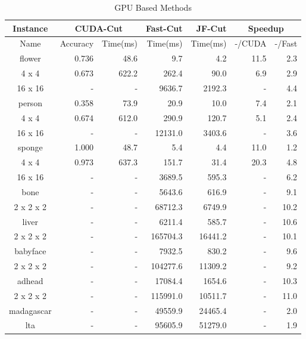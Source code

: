 \begin{table}
\center
\caption{GPU Based Methods}
\label{table gpu performance}
{
    \fontsize{6.5pt}{7.5pt}\selectfont
    \begin{tabular}{@{ }c|r|r|r|r|r@{ }r@{ }}
    \hline
    Instance & \multicolumn{2}{|c|}{CUDA-Cut} & Fast-Cut & JF-Cut & \multicolumn{2}{c}{Speedup} \\
    \hline
    Name        & Accuracy & Time(ms) & Time(ms) & Time(ms) & -/CUDA & -/Fast\\
    \hline
    flower      & 0.736 & 48.6  & 9.7       & 4.2       & 11.5  & 2.3\\
    4 x 4       & 0.673 & 622.2 & 262.4     & 90.0      & 6.9   & 2.9\\
    16 x 16     & -     & -     & 9636.7    & 2192.3    & -     & 4.4\\
    person      & 0.358 & 73.9  & 20.9      & 10.0      & 7.4   & 2.1\\
    4 x 4       & 0.674 & 612.0 & 290.9     & 120.7     & 5.1   & 2.4\\
    16 x 16     & -     & -     & 12131.0   & 3403.6    & -     & 3.6\\
    sponge      & 1.000 & 48.7  & 5.4       & 4.4       & 11.0  & 1.2\\
    4 x 4       & 0.973 & 637.3 & 151.7     & 31.4      & 20.3  & 4.8\\
    16 x 16     & -     & -     & 3689.5    & 595.3     & -     & 6.2\\
    \hline
    bone        & -     & -     & 5643.6    & 616.9     & -     & 9.1\\
    2 x 2 x 2   & -     & -     & 68712.3   & 6749.9    & -     & 10.2\\
    liver       & -     & -     & 6211.4    & 585.7     & -     & 10.6\\
    2 x 2 x 2   & -     & -     & 165704.3  & 16441.2   & -     & 10.1\\
    babyface    & -     & -     & 7932.5    & 830.2     & -     & 9.6\\
    2 x 2 x 2   & -     & -     & 104277.6  & 11309.2   & -     & 9.2\\
    adhead      & -     & -     & 17084.4   & 1654.6    & -     & 10.3\\
    2 x 2 x 2   & -     & -     & 115991.0  & 10511.7   & -     & 11.0\\
    \hline
    madagascar  & -     & -     & 49559.9   & 24465.4   & -     & 2.0\\
    lta         & -     & -     & 95605.9   & 51279.0   & -     & 1.9\\

\end{tabular}}
\end{table}
